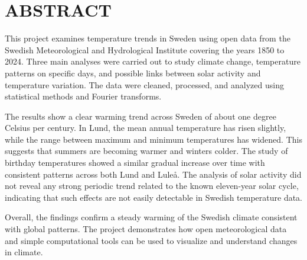 \documentclass[12pt,titlepage]{article}
\begin{document}




\flushbottom

\thispagestyle{empty}

\section*{ABSTRACT}
This project examines temperature trends in Sweden using open data from the Swedish Meteorological and Hydrological Institute covering the years 1850 to 2024. Three main analyses were carried out to study climate change, temperature patterns on specific days, and possible links between solar activity and temperature variation. The data were cleaned, processed, and analyzed using statistical methods and Fourier transforms.

The results show a clear warming trend across Sweden of about one degree Celsius per century. In Lund, the mean annual temperature has risen slightly, while the range between maximum and minimum temperatures has widened. This suggests that summers are becoming warmer and winters colder. The study of birthday temperatures showed a similar gradual increase over time with consistent patterns across both Lund and Luleå. The analysis of solar activity did not reveal any strong periodic trend related to the known eleven-year solar cycle, indicating that such effects are not easily detectable in Swedish temperature data.

Overall, the findings confirm a steady warming of the Swedish climate consistent with global patterns. The project demonstrates how open meteorological data and simple computational tools can be used to visualize and understand changes in climate.







\newpage







%


%
\end{document}
